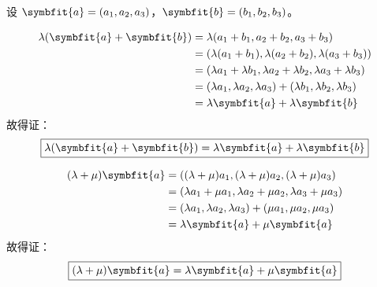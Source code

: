 \begin{myproof}
    设 $\symbfit{a} = (a_1, a_2, a_3)$，$\symbfit{b} = (b_1, b_2, b_3)$。


    \begin{equation*}
        \begin{aligned}
            \lambda(\symbfit{a} + \symbfit{b}) & = \lambda(a_1 + b_1, a_2 + b_2, a_3 + b_3)                                          \\
                                               & = (\lambda(a_1 + b_1), \lambda(a_2 + b_2), \lambda(a_3 + b_3))                      \\
                                               & = (\lambda a_1 + \lambda b_1, \lambda a_2 + \lambda b_2, \lambda a_3 + \lambda b_3) \\
                                               & = (\lambda a_1, \lambda a_2, \lambda a_3) + (\lambda b_1, \lambda b_2, \lambda b_3) \\
                                               & = \lambda\symbfit{a} + \lambda\symbfit{b}
        \end{aligned}
    \end{equation*}
    故得证：
    \begin{equation*}
        \boxed{\lambda(\symbfit{a} + \symbfit{b}) = \lambda\symbfit{a} + \lambda\symbfit{b}}
    \end{equation*}


    \begin{equation*}
        \begin{aligned}
            (\lambda + \mu)\symbfit{a} & = ((\lambda + \mu)a_1, (\lambda + \mu)a_2, (\lambda + \mu)a_3)          \\
                                       & = (\lambda a_1 + \mu a_1, \lambda a_2 + \mu a_2, \lambda a_3 + \mu a_3) \\
                                       & = (\lambda a_1, \lambda a_2, \lambda a_3) + (\mu a_1, \mu a_2, \mu a_3) \\
                                       & = \lambda\symbfit{a} + \mu\symbfit{a}
        \end{aligned}
    \end{equation*}
    故得证：
    \begin{equation*}
        \boxed{(\lambda + \mu)\symbfit{a} = \lambda\symbfit{a} + \mu\symbfit{a}}
    \end{equation*}


\end{myproof}

